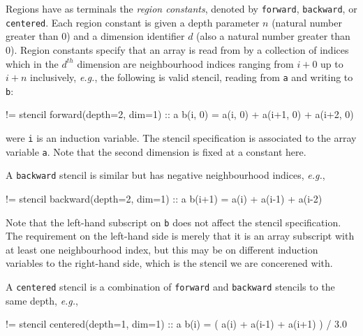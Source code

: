 \documentclass[9pt]{sigplanconf}
\theoremstyle{definition}
\newcommand{\eg}{\emph{e.g.}}
\newcommand{\term}[1]{\texttt{#1}}
\begin{document}
Regions have as terminals the \emph{region constants}, denoted by 
\term{forward}, \term{backward}, or \term{centered}. Each
region constant is given a depth parameter $n$ (natural number greater
than 0) and a dimension identifier $d$ (also a natural number greater than
0). Region constants specify that an array is read from by a collection
of indices which in the $d^{th}$ dimension are 
neighbourhood indices ranging from $i + 0$ up to $i + n$ inclusively, \eg{}, the
following is valid stencil, reading from \term{a} and writing to \term{b}:
\begin{ExmVerbatim}
!= stencil forward(depth=2, dim=1) :: a
b(i, 0) = a(i, 0) + a(i+1, 0) + a(i+2, 0)
\end{ExmVerbatim}
were \texttt{i} is an induction variable.  The stencil specification
is associated to the array variable \texttt{a}. Note that the second
dimension is fixed at a constant here.

A \term{backward} stencil
is similar but has negative neighbourhood indices, \eg{}, 
%
\begin{ExmVerbatim}
!= stencil backward(depth=2, dim=1) :: a
b(i+1) = a(i) + a(i-1) + a(i-2)
\end{ExmVerbatim}
%
Note that the left-hand subscript on \term{b} does not affect
the stencil specification. The requirement on the left-hand side
is merely that it is an array subscript with at least one neighbourhood index,
but this may be on different induction variables to the right-hand
side, which is the stencil we are concerened with. 

A \texttt{centered} stencil is a combination of \texttt{forward}
and \texttt{backward} stencils to the same depth, \eg{},
\begin{ExmVerbatim}
!= stencil centered(depth=1, dim=1) :: a
b(i) = ( a(i) + a(i-1) + a(i+1) ) / 3.0
\end{ExmVerbatim}
\end{document}
